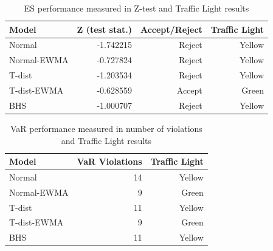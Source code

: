 \documentclass[a4paper]{article}
\begin{document}
\begin{table}[H]
    \centering
    \caption{ES performance measured in Z-test and Traffic Light results}
    \vspace{0.2cm}
    \begin{tabular}{lrrr}
        \toprule
                Model &  Z (test stat.) & Accept/Reject & Traffic Light \\
        \midrule
                Normal &       -1.742215 &        Reject &                         Yellow \\
            Normal-EWMA &       -0.727824 &        Reject &                         Yellow \\
                T-dist &       -1.203534 &        Reject &                         Yellow \\
            T-dist-EWMA &       -0.628559 &        Accept &                          Green \\
            BHS &       -1.000707 &        Reject &                         Yellow \\
        \bottomrule
    \end{tabular} 
\end{table}



\begin{table}[H]
    \centering
    \caption{VaR performance measured in number of violations and Traffic Light results}
    \vspace{0.2cm}
    \begin{tabular}{lrr}
        \toprule
              Model &  VaR Violations & Traffic Light \\
        \midrule
              Normal &               14 &                           Yellow \\
         Normal-EWMA &                9 &                            Green \\
              T-dist &               11 &                           Yellow \\
         T-dist-EWMA &                9 &                            Green \\
            BHS &               11 &                           Yellow \\
        \bottomrule
    \end{tabular}    
\end{table}
 
\end{document}

